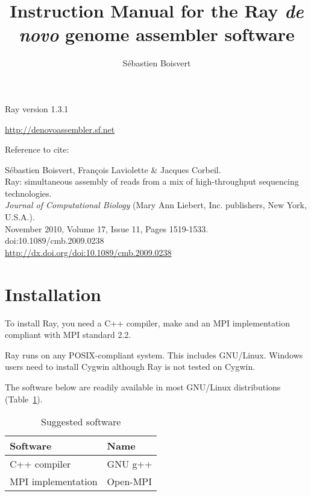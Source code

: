 \documentclass{article}
\begin{document}
\author{Sébastien Boisvert}
\title{Instruction Manual for the Ray \emph{de novo} genome assembler software}
\maketitle


\vspace{2cm}
Ray version 1.3.1

\vspace{2cm}

\href{http://denovoassembler.sf.net}{http://denovoassembler.sf.net}

\vspace{2cm}

Reference to cite: 
\vspace{2cm}

\noindent
Sébastien Boisvert, François Laviolette \& Jacques Corbeil.\\
Ray: simultaneous assembly of reads from a mix of high-throughput sequencing technologies.\\
\emph{Journal of Computational Biology} (Mary Ann Liebert, Inc. publishers, New York, U.S.A.).\\
November 2010, Volume 17, Issue 11, Pages 1519-1533.\\
doi:10.1089/cmb.2009.0238\\
\href{http://dx.doi.org/doi:10.1089/cmb.2009.0238}{http://dx.doi.org/doi:10.1089/cmb.2009.0238}


\newpage
\tableofcontents
\newpage

\section{Installation}

To install Ray, you need a C++ compiler, make and an MPI implementation compliant
with MPI standard 2.2.

Ray runs on any POSIX-compliant system. This includes GNU/Linux.
Windows users need to install Cygwin although Ray is not tested on Cygwin.

The software below are readily available in most GNU/Linux distributions (Table~\ref{software}).

\begin{table}[h]
\caption{Suggested software}\label{software}
\begin{tabular}{ll}
\hline
Software & Name \\
\hline
C++ compiler & GNU g++ \\
MPI implementation & Open-MPI \\
\hline
\end{tabular}
\end{table}
\end{document}
